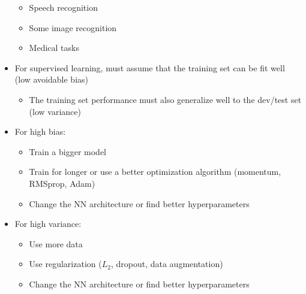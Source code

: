 \documentclass[12pt, letterpaper]{article}
\begin{document}
\begin{itemize}
\begin{itemize}
            \item Speech recognition
            \item Some image recognition
            \item Medical tasks
        \end{itemize}
        \item For supervised learning, must assume that the training set can be fit well (low avoidable bias)
        \begin{itemize}
            \item The training set performance must also generalize well to the dev/test set (low variance)
        \end{itemize}
        \item For high bias:
        \begin{itemize}
            \item Train a bigger model
            \item Train for longer or use a better optimization algorithm (momentum, RMSprop, Adam)
            \item Change the NN architecture or find better hyperparameters
        \end{itemize}
        \item For high variance:
        \begin{itemize}
            \item Use more data 
            \item Use regularization ($L_2$, dropout, data augmentation)
            \item Change the NN architecture or find better hyperparameters
        \end{itemize}
    \end{itemize} 
\end{document}
